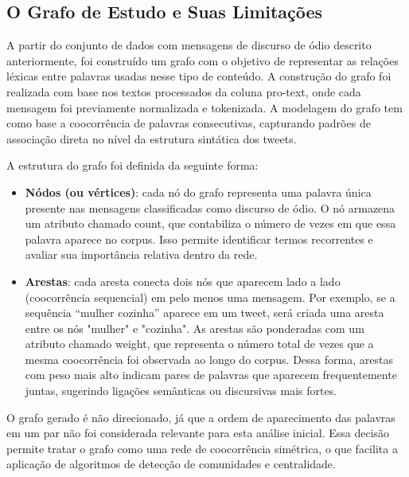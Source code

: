 \documentclass[12pt, a4paper]{article}
\begin{document}

\subsection{O Grafo de Estudo e Suas Limitações}
A partir do conjunto de dados com mensagens de discurso de ódio descrito anteriormente, foi construído um grafo com o objetivo de representar as relações léxicas entre palavras usadas nesse tipo de conteúdo. A construção do grafo foi realizada com base nos textos processados da coluna pro-text, onde cada mensagem foi previamente normalizada e tokenizada. A modelagem do grafo tem como base a coocorrência de palavras consecutivas, capturando padrões de associação direta no nível da estrutura sintática dos tweets.

A estrutura do grafo foi definida da seguinte forma:
\begin{itemize}
    \item \textbf{Nódos (ou vértices)}: cada nó do grafo representa uma palavra única presente nas mensagens classificadas como discurso de ódio. O nó armazena um atributo chamado count, que contabiliza o número de vezes em que essa palavra aparece no corpus. Isso permite identificar termos recorrentes e avaliar sua importância relativa dentro da rede.

    \item \textbf{Arestas}: cada aresta conecta dois nós que aparecem lado a lado (coocorrência sequencial) em pelo menos uma mensagem. Por exemplo, se a sequência “mulher cozinha” aparece em um tweet, será criada uma aresta entre os nós "mulher" e "cozinha". As arestas são ponderadas com um atributo chamado weight, que representa o número total de vezes que a mesma coocorrência foi observada ao longo do corpus. Dessa forma, arestas com peso mais alto indicam pares de palavras que aparecem frequentemente juntas, sugerindo ligações semânticas ou discursivas mais fortes.

\end{itemize}
O grafo gerado é não direcionado, já que a ordem de aparecimento das palavras em um par não foi considerada relevante para esta análise inicial. Essa decisão permite tratar o grafo como uma rede de coocorrência simétrica, o que facilita a aplicação de algoritmos de detecção de comunidades e centralidade.
\end{document}
